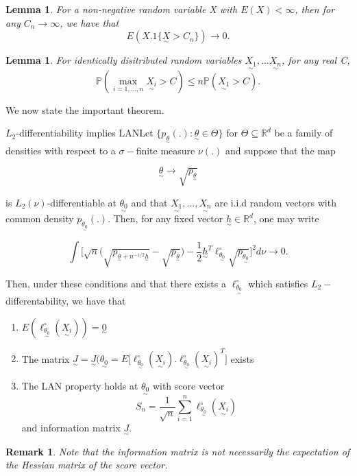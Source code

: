 \documentclass[twoside]{article}
\newtheorem{lemma}[theorem]{Lemma}
\newtheorem{remark}[theorem]{Remark}
\newcommand{\prob}{\mathbb{P}}
\newcommand{\utilde}{\underset{\sim}}
\begin{document}
\begin{lemma}For a non-negative random variable X with $E(X) < \infty$, then for any $C_n \rightarrow \infty$, we have that 
$$
E(X.1\{\utilde{X} > C_n\}) \rightarrow 0.
$$
\end{lemma}

\begin{lemma}For identically disitributed random variables $\utilde{X_1},...\utilde{X_n}$, for any real C, 
$$
\prob(\max_{i=1,...,n}\utilde{X_i} > C) \leq n\prob(\utilde{X_1} > C).
$$
\end{lemma}

We now state the important theorem.
\begin{theorem_exam}{$L_2$-differentiability implies LAN}{}Let $\{p_{\utilde{\theta}}(.): \utilde{\theta} \in \Theta\}$ for $\Theta \subseteq \mathbb{R}^d$ be a family of densities with respect to a $\sigma-$finite measure $\nu(.)$ and suppose that the map 

$$
\utilde{\theta} \rightarrow \sqrt{p_{\utilde{\theta}}}
$$

is $L_2(\nu)$-differentiable at $\utilde{\theta_0}$ and that $\utilde{X_1},...,\utilde{X_n}$ are i.i.d random vectors with common density $p_{\utilde{\theta_0}}(.).$ Then, for any fixed vector $\utilde{h} \in \mathbb{R}^d$, one may write 

$$
\int \bigg[\sqrt{n} \bigg(\sqrt{p_{\utilde{\theta} + n^{-1/2}\utilde{h}}} - \sqrt{p_{\utilde{\theta}}} \bigg) - \frac{1}{2}\utilde{h}^T\ell_{\utilde{\theta_0}}^{\circ}\sqrt{p_{\utilde{\theta_0}}} \bigg]^2 d\nu \rightarrow 0.
$$

Then, under these conditions and that there exists a $\ell_{\utilde{\theta_0}}^{\circ}$ which satisfies $L_2-$differentability, we have that 
\begin{enumerate}
\item $E(\ell_{\utilde{\theta_0}}^{\circ}(\utilde{X_i})) = \utilde{0}$
\item The matrix $\utilde{J} = \utilde{J}(\utilde{\theta_0} = E\big[\ell_{\utilde{\theta_0}}^{\circ}(\utilde{X_i}).\ell_{\utilde{\theta_0}}^{\circ}(\utilde{X_i})^T \big]$ exists
\item The LAN property holds at $\utilde{\theta_0}$ with score vector 
$$
S_n = \frac{1}{\sqrt{n}}\sum_{i=1}^{n}\ell_{\utilde{\theta_0}}^{\circ}(\utilde{X_i})
$$
and information matrix $\utilde{J}.$
\end{enumerate}
\end{theorem_exam} 

\begin{remark}Note that the information matrix is not necessarily the expectation of the Hessian matrix of the score vector.
\end{remark}
\end{document}

